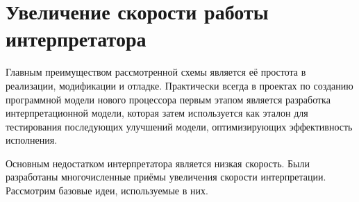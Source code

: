 %     
%     
% 

\section[Увеличение скорости работы]{Увеличение скорости работы интерпретатора}

Главным преимуществом рассмотренной схемы является её простота в реализации, модификации и отладке. Практически всегда в проектах по созданию программной модели нового процессора первым этапом является разработка интерпретационной модели, которая затем используется как эталон для тестирования последующих улучшений модели, оптимизирующих эффективность исполнения.

Основным недостатком интерпретатора является низкая скорость. Были разработаны многочисленные приёмы увеличения скорости интерпретации. Рассмотрим базовые идеи, используемые в них.

